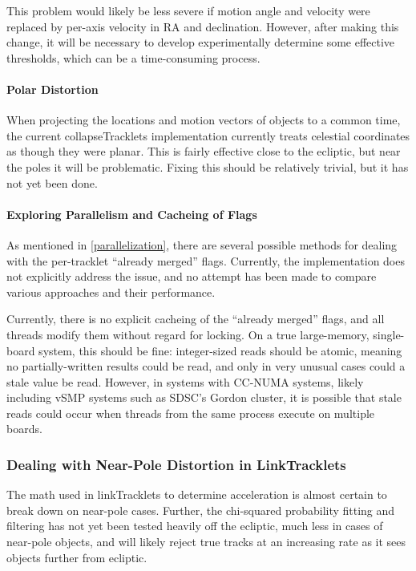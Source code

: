 This problem would likely be less severe if motion angle and velocity
were replaced by per-axis velocity in RA and declination.  However,
after making this change, it will be necessary to develop
experimentally determine some effective thresholds, which can be a
time-consuming process.

\paragraph{Polar Distortion}
When projecting the locations and motion vectors of objects to a
common time, the current collapseTracklets implementation currently
treats celestial coordinates as though they were planar.  This is
fairly effective close to the ecliptic, but near the poles it will be
problematic.  Fixing this should be relatively trivial, but it has not
yet been done.

\paragraph{Exploring Parallelism and Cacheing of Flags}
As mentioned in \ref{parallelization}, there are several possible
methods for dealing with the per-tracklet ``already merged'' flags.
Currently, the implementation does not explicitly address the issue,
and no attempt has been made to compare various approaches and their
performance.

Currently, there is no explicit cacheing of the ``already merged''
flags, and all threads modify them without regard for locking.  On a
true large-memory, single-board system, this should be fine:
integer-sized reads should be atomic, meaning no partially-written
results could be read, and only in very unusual cases could a stale
value be read. However, in systems with CC-NUMA systems, likely
including vSMP systems such as SDSC's Gordon cluster, it is possible
that stale reads could occur when threads from the same process
execute on multiple boards.


\subsubsection{Dealing with Near-Pole Distortion in LinkTracklets}

The math used in linkTracklets to determine acceleration is almost
certain to break down on near-pole cases.  Further, the chi-squared
probability fitting and filtering has not yet been tested heavily off
the ecliptic, much less in cases of near-pole objects, and will likely
reject true tracks at an increasing rate as it sees objects further
from ecliptic.

